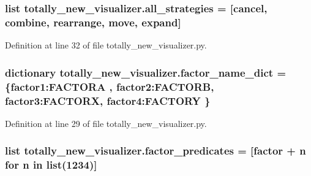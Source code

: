 \subsubsection[{all\+\_\+strategies}]{\setlength{\rightskip}{0pt plus 5cm}list totally\+\_\+new\+\_\+visualizer.\+all\+\_\+strategies = \mbox{[}\textquotesingle{}cancel\textquotesingle{}, \textquotesingle{}combine\textquotesingle{}, \textquotesingle{}rearrange\textquotesingle{}, \textquotesingle{}move\textquotesingle{}, \textquotesingle{}expand\textquotesingle{}\mbox{]}}\label{namespacetotally__new__visualizer_a0336db197e4d6b0cc49dd792fa21d890}


Definition at line 32 of file totally\+\_\+new\+\_\+visualizer.\+py.

\hypertarget{namespacetotally__new__visualizer_ac35b4d88f3973e9437d26d620f6404d3}{}
\subsubsection[{factor\+\_\+name\+\_\+dict}]{\setlength{\rightskip}{0pt plus 5cm}dictionary totally\+\_\+new\+\_\+visualizer.\+factor\+\_\+name\+\_\+dict = \{\textquotesingle{}factor1\textquotesingle{}\+:\textquotesingle{}F\+A\+C\+T\+O\+R\+A\textquotesingle{} , \textquotesingle{}factor2\textquotesingle{}\+:\textquotesingle{}F\+A\+C\+T\+O\+R\+B\textquotesingle{}, \textquotesingle{}factor3\textquotesingle{}\+:\textquotesingle{}F\+A\+C\+T\+O\+R\+X\textquotesingle{}, \textquotesingle{}factor4\textquotesingle{}\+:\textquotesingle{}F\+A\+C\+T\+O\+R\+Y\textquotesingle{} \}}\label{namespacetotally__new__visualizer_ac35b4d88f3973e9437d26d620f6404d3}


Definition at line 29 of file totally\+\_\+new\+\_\+visualizer.\+py.

\hypertarget{namespacetotally__new__visualizer_ab706e5502043e33aaccc4cd5db3a11a8}{}
\subsubsection[{factor\+\_\+predicates}]{\setlength{\rightskip}{0pt plus 5cm}list totally\+\_\+new\+\_\+visualizer.\+factor\+\_\+predicates = \mbox{[}\textquotesingle{}factor\textquotesingle{} + n for n in list(\textquotesingle{}1234\textquotesingle{})\mbox{]}}\label{namespacetotally__new__visualizer_ab706e5502043e33aaccc4cd5db3a11a8}


